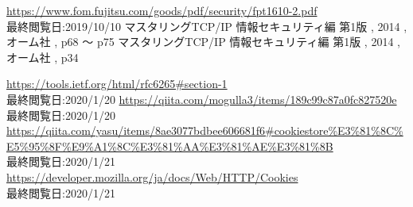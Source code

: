 \def\line{−\hspace*{-.7zw}−}

\begin{thebibliography}{99}



 \url{https://www.fom.fujitsu.com/goods/pdf/security/fpt1610-2.pdf} \\最終閲覧日:2019/10/10
 マスタリングTCP/IP 情報セキュリティ編 第1版 , 2014 , オーム社 , p68 〜 p75 
 マスタリングTCP/IP 情報セキュリティ編 第1版 , 2014 , オーム社 , p34 

 \url{https://tools.ietf.org/html/rfc6265#section-1} \\ 最終閲覧日:2020/1/20
 \url{https://qiita.com/mogulla3/items/189c99c87a0fc827520e} \\ 最終閲覧日:2020/1/20
 \url{https://qiita.com/yasu/items/8ae3077bdbee606681f6#cookiestore%E3%81%8C%E5%95%8F%E9%A1%8C%E3%81%AA%E3%81%AE%E3%81%8B} \\ 最終閲覧日:2020/1/21
 \url{https://developer.mozilla.org/ja/docs/Web/HTTP/Cookies} \\最終閲覧日:2020/1/21
\end{thebibliography}
